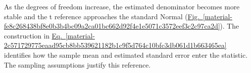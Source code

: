 \documentclass[11pt,a4paper]{article}
\begin{document}

\medskip

As the degrees of freedom increase, the estimated denominator becomes more stable and the t reference approaches the standard Normal (\hyperref[material-fe8c268438bf8e0b3b4bc09a2ca01bc662d92f4e1e5071c3572eef3c2c97ca2d]{Fig.~\ref*{material-fe8c268438bf8e0b3b4bc09a2ca01bc662d92f4e1e5071c3572eef3c2c97ca2d}}). The construction in \hyperref[material-2c571729775eaad95cb8bb539621182b1c9f5d764c10bfc3db061d1b663465ea]{Eq.~\ref*{material-2c571729775eaad95cb8bb539621182b1c9f5d764c10bfc3db061d1b663465ea}} identifies how the sample mean and estimated standard error enter the statistic. The sampling assumptions justify this reference.
\end{document}
